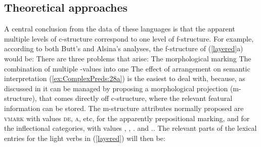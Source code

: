 \documentclass[output=paper,hidelinks]{langscibook}
\begin{document}
\subsection{Theoretical approaches}
A central conclusion from the data of these languages is that the
apparent multiple levels of c-structure correspond to one level of f-structure.
For example, according to both Butt's and Alsina's analyses, the f-structure of
(\ref{layered}a) would be:
There are three problems that arise:
\ea
\ea\label{ex:ComplexPreds:28a} The morphological marking
\ex\label{ex:ComplexPreds:28b} The combination of multiple {\PRED}-values into one
\ex\label{ex:ComplexPreds:28c} The effect of arrangement on semantic interpretation
\z\z
(\ref{ex:ComplexPreds:28a}) is the easiest to deal with, because, as discussed in \citet{ButtEtAl1999}
it can be managed by proposing a morphological projection (m-structure), that comes
directly off c-structure, where the relevant featural information can be stored.
The m-structure attributes normally proposed are \textsc{vmark} with values \textsc{de},
\textsc{a}, etc, for the apparently prepositional marking, and {\VFORM} for the
inflectional categories, with values {\FIN}, {\INF}, {\PRS.\PTCP} and {\PST.\PTCP}.
The relevant parts of the lexical entries for the light verbs in (\ref{layered}) will then be:
\end{document}
